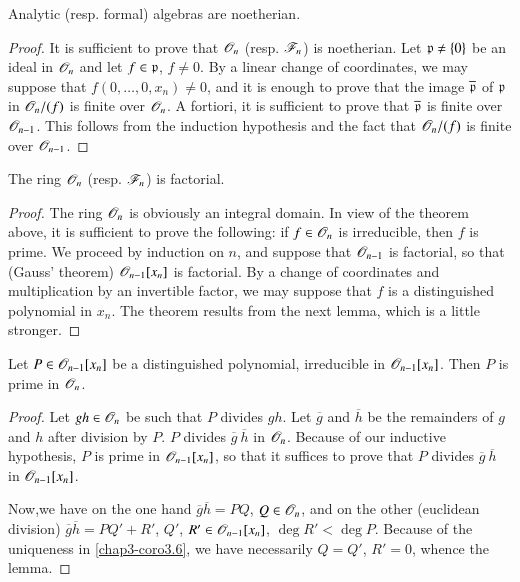 \begin{theorem}\label{chap3-thm3.8}
Analytic (resp. formal) algebras are noetherian.
\end{theorem}

\begin{proof}
It is sufficient to prove that $\mathscr{O}_{n}$ (resp. $\mathscr{F}_{n}$) is noetherian. Let $\mathfrak{p}\neq \{0\}$ be an ideal in $\mathscr{O}_{n}$ and let $f\in \mathfrak{p}$, $f\neq 0$. By a linear change of coordinates, we may suppose that $f(0,\ldots,0,x_{n})\neq 0$, and it is enough to prove that the image $\overline{\mathfrak{p}}$ of $\mathfrak{p}$ in $\mathscr{O}_{n}/(f)$ is finite over $\mathscr{O}_{n}$. A fortiori, it is sufficient to prove that $\overline{\mathfrak{p}}$ is finite over $\mathscr{O}_{n-1}$. This follows from the induction hypothesis and the fact that $\mathscr{O}_{n}/(f)$ is finite over $\mathscr{O}_{n-1}$.
\end{proof}

\begin{theorem}\label{chap3-thm3.9}
The ring $\mathscr{O}_{n}$ (resp. $\mathscr{F}_{n}$) is factorial.
\end{theorem}

\begin{proof}
The ring $\mathscr{O}_{n}$ is obviously an integral domain. In view of the theorem above, it is sufficient to prove the following: if $f\in \mathscr{O}_{n}$ is irreducible, then $f$ is prime. We proceed by induction on $n$, and suppose that $\mathscr{O}_{n-1}$ is factorial, so that (Gauss' theorem) $\mathscr{O}_{n-1}[x_{n}]$ is factorial. By a change of coordinates and multiplication by an invertible factor, we may suppose that $f$ is a distinguished polynomial in $x_{n}$. The theorem results from the next lemma, which is a little stronger.
\end{proof}

\begin{lemma}\label{chap3-lem3.10}
Let $P\in \mathscr{O}_{n-1}[x_{n}]$ be a distinguished polynomial, irreducible in $\mathscr{O}_{n-1}[x_{n}]$. Then $P$ is prime in $\mathscr{O}_{n}$.
\end{lemma}

\begin{proof}
Let $gh\in \mathscr{O}_{n}$ be such that $P$ divides $gh$. Let $\overline{g}$ and $\overline{h}$ be the remainders of $g$ and $h$ after division by $P$. $P$ divides $\overline{g} \ \overline{h}$ in $\mathscr{O}_{n}$. Because of our inductive hypothesis, $P$ is prime in $\mathscr{O}_{n-1}[x_{n}]$, so that it suffices to prove that $P$ divides $\overline{g} \ \overline{h}$ in $\mathscr{O}_{n-1}[x_{n}]$.

Now,\pageoriginale we have on the one hand $\overline{g}\overline{h}=PQ$, $Q\in \mathscr{O}_{n}$, and on the other (euclidean division) $\overline{g}\overline{h}=PQ'+R'$, $Q'$, $R'\in \mathscr{O}_{n-1}[x_{n}]$, $\deg R'<\deg P$. Because of the uniqueness in \eqref{chap3-coro3.6}, we have necessarily $Q=Q'$, $R'=0$, whence the lemma.
\end{proof}

